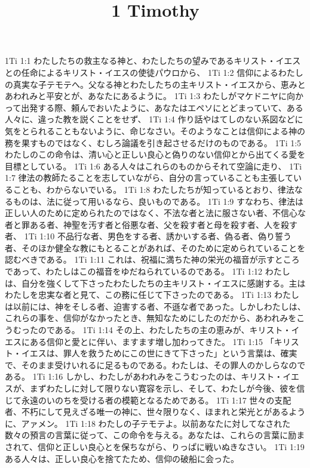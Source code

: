 

\title{1 Timothy}

1Ti 1:1  わたしたちの救主なる神と、わたしたちの望みであるキリスト・イエスとの任命によるキリスト・イエスの使徒パウロから、
1Ti 1:2  信仰によるわたしの真実な子テモテへ。父なる神とわたしたちの主キリスト・イエスから、恵みとあわれみと平安とが、あなたにあるように。
1Ti 1:3  わたしがマケドニヤに向かって出発する際、頼んでおいたように、あなたはエペソにとどまっていて、ある人々に、違った教を説くことをせず、
1Ti 1:4  作り話やはてしのない系図などに気をとられることもないように、命じなさい。そのようなことは信仰による神の務を果すものではなく、むしろ論議を引き起させるだけのものである。
1Ti 1:5  わたしのこの命令は、清い心と正しい良心と偽りのない信仰とから出てくる愛を目標としている。
1Ti 1:6  ある人々はこれらのものからそれて空論に走り、
1Ti 1:7  律法の教師たることを志していながら、自分の言っていることも主張していることも、わからないでいる。
1Ti 1:8  わたしたちが知っているとおり、律法なるものは、法に従って用いるなら、良いものである。
1Ti 1:9  すなわち、律法は正しい人のために定められたのではなく、不法な者と法に服さない者、不信心な者と罪ある者、神聖を汚す者と俗悪な者、父を殺す者と母を殺す者、人を殺す者、
1Ti 1:10  不品行な者、男色をする者、誘かいする者、偽る者、偽り誓う者、そのほか健全な教にもとることがあれば、そのために定められていることを認むべきである。
1Ti 1:11  これは、祝福に満ちた神の栄光の福音が示すところであって、わたしはこの福音をゆだねられているのである。
1Ti 1:12  わたしは、自分を強くして下さったわたしたちの主キリスト・イエスに感謝する。主はわたしを忠実な者と見て、この務に任じて下さったのである。
1Ti 1:13  わたしは以前には、神をそしる者、迫害する者、不遜な者であった。しかしわたしは、これらの事を、信仰がなかったとき、無知なためにしたのだから、あわれみをこうむったのである。
1Ti 1:14  その上、わたしたちの主の恵みが、キリスト・イエスにある信仰と愛とに伴い、ますます増し加わってきた。
1Ti 1:15  「キリスト・イエスは、罪人を救うためにこの世にきて下さった」という言葉は、確実で、そのまま受けいれるに足るものである。わたしは、その罪人のかしらなのである。
1Ti 1:16  しかし、わたしがあわれみをこうむったのは、キリスト・イエスが、まずわたしに対して限りない寛容を示し、そして、わたしが今後、彼を信じて永遠のいのちを受ける者の模範となるためである。
1Ti 1:17  世々の支配者、不朽にして見えざる唯一の神に、世々限りなく、ほまれと栄光とがあるように、アァメン。
1Ti 1:18  わたしの子テモテよ。以前あなたに対してなされた数々の預言の言葉に従って、この命令を与える。あなたは、これらの言葉に励まされて、信仰と正しい良心とを保ちながら、りっぱに戦いぬきなさい。
1Ti 1:19  ある人々は、正しい良心を捨てたため、信仰の破船に会った。

